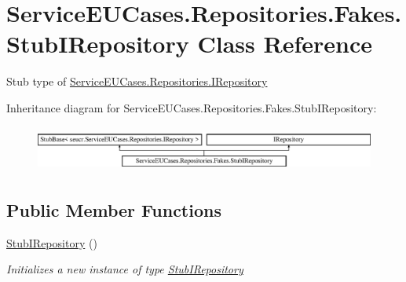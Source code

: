 \hypertarget{class_service_e_u_cases_1_1_repositories_1_1_fakes_1_1_stub_i_repository}{\section{Service\-E\-U\-Cases.\-Repositories.\-Fakes.\-Stub\-I\-Repository Class Reference}
\label{class_service_e_u_cases_1_1_repositories_1_1_fakes_1_1_stub_i_repository}
}


Stub type of \hyperlink{interface_service_e_u_cases_1_1_repositories_1_1_i_repository}{Service\-E\-U\-Cases.\-Repositories.\-I\-Repository} 


Inheritance diagram for Service\-E\-U\-Cases.\-Repositories.\-Fakes.\-Stub\-I\-Repository\-:\begin{figure}[H]
\begin{center}
\leavevmode
\includegraphics[height=1.521739cm]{class_service_e_u_cases_1_1_repositories_1_1_fakes_1_1_stub_i_repository}
\end{center}
\end{figure}
\subsection*{Public Member Functions}
\begin{DoxyCompactItemize}
\item 
\hyperlink{class_service_e_u_cases_1_1_repositories_1_1_fakes_1_1_stub_i_repository_ae794e647d101c22730b61c095eba7ef8}{Stub\-I\-Repository} ()
\begin{DoxyCompactList}\small\item\em Initializes a new instance of type \hyperlink{class_service_e_u_cases_1_1_repositories_1_1_fakes_1_1_stub_i_repository}{Stub\-I\-Repository}\end{DoxyCompactList}\end{DoxyCompactItemize}
